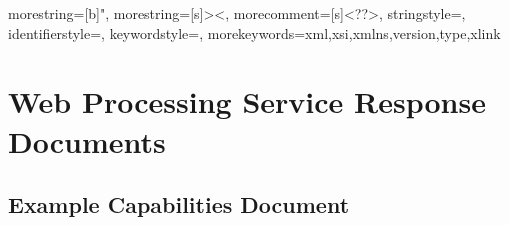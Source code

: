 
{
	morestring=[b]",
	morestring=[s]{>}{<},
	morecomment=[s]{<?}{?>},
	stringstyle=\color{black},
	identifierstyle=\color{darkblue},
	keywordstyle=\color{cyan},
	morekeywords={xml,xsi,xmlns,version,type,xlink}%
}


\chapter{Web Processing Service Response Documents}
\label{app:WPS}

\section{Example Capabilities Document}
\label{app:wpsCapabilities}

